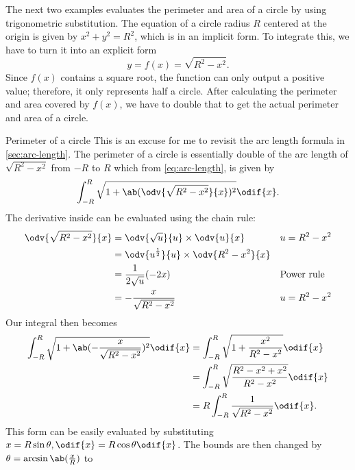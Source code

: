 The next two examples evaluates the perimeter and area of a circle by using trigonometric substitution. The equation of a circle radius $R$ centered at the origin is given by $x^2 + y^2 = R^2$, which is in an implicit form. To integrate this, we have to turn it into an explicit form
\begin{equation}
	y = f(x) = \sqrt{R^2 - x^2}.
\end{equation}
Since $f(x)$ contains a square root, the function can only output a positive value; therefore, it only represents half a circle. After calculating the perimeter and area covered by $f(x)$, we have to double that to get the actual perimeter and area of a circle.

\begin{exmp}{Perimeter of a circle}{}
	This is an excuse for me to revisit the arc length formula in \cref{sec:arc-length}. The perimeter of a circle is essentially double of the arc length of $\sqrt{R^2 - x^2}$ from $-R$ to $R$ which from \cref{eq:arc-length}, is given by
	\begin{equation}
		\int_{-R}^{R}\sqrt{1 + \ab(\odv{\sqrt{R^2 - x^2}}{x})^2}\odif{x}.
	\end{equation}
	The derivative inside can be evaluated using the chain rule:
	\begin{align}
		\odv{\sqrt{R^2 - x^2}}{x} & = \odv{\sqrt{u}}{u} \times \odv{u}{x}                &  & u = R^2 - x^2       \\
		                          & = \odv{u^{\frac{1}{2}}}{u} \times \odv{R^2 - x^2}{x}                          \\
		                          & = \frac{1}{2\sqrt{u}}(-2x)                           &  & \textrm{Power rule} \\
		                          & = -\frac{x}{\sqrt{R^2 - x^2}}                        &  & u = R^2 - x^2
	\end{align}
	Our integral then becomes
	\begin{align}
		\int_{-R}^{R}\sqrt{1 + \ab(-\frac{x}{\sqrt{R^2 - x^2}})^2}\odif{x}
		 & = \int_{-R}^{R}\sqrt{1 + \frac{x^2}{R^2 - x^2}}\odif{x}         \\
		 & = \int_{-R}^{R}\sqrt{\frac{R^2 - x^2 + x^2}{R^2 - x^2}}\odif{x} \\
		 & = R\int_{-R}^{R}\frac{1}{\sqrt{R^2 - x^2}}\odif{x}.
	\end{align}
	This form can be easily evaluated by substituting $x = R\sin\theta, \odif{x} = R\cos\theta\odif{x}$. The bounds are then changed by $\theta = \arcsin\ab(\frac{x}{R})$ to

\end{exmp}
